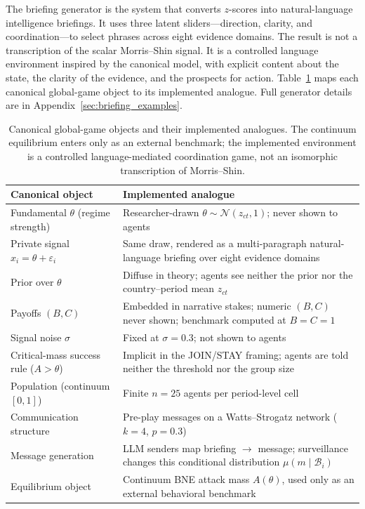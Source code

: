 \documentclass[12pt]{article}
\begin{document}
The briefing generator is the system that converts $z$-scores into natural-language intelligence briefings. It uses three latent sliders---direction, clarity, and coordination---to select phrases across eight evidence domains. The result is not a transcription of the scalar Morris--Shin signal. It is a controlled language environment inspired by the canonical model, with explicit content about the state, the clarity of the evidence, and the prospects for action. Table~\ref{tab:gg_mapping} maps each canonical global-game object to its implemented analogue. Full generator details are in Appendix~\ref{sec:briefing_examples}.

\begin{table}[t]
\centering
\caption{Canonical global-game objects and their implemented analogues. The continuum equilibrium enters only as an external benchmark; the implemented environment is a controlled language-mediated coordination game, not an isomorphic transcription of Morris--Shin.}
\label{tab:gg_mapping}
\footnotesize
\setlength{\tabcolsep}{4pt}
\begin{tabular}{p{} p{}}
\toprule
Canonical object & Implemented analogue \\
\midrule
Fundamental $\theta$ (regime strength) & Researcher-drawn $\theta \sim \mathcal{N}(z_{ct},1)$; never shown to agents \\
\addlinespace
Private signal $x_i = \theta + \varepsilon_i$ & Same draw, rendered as a multi-paragraph natural-language briefing over eight evidence domains \\
\addlinespace
Prior over $\theta$ & Diffuse in theory; agents see neither the prior nor the country--period mean $z_{ct}$ \\
\addlinespace
Payoffs $(B,C)$ & Embedded in narrative stakes; numeric $(B,C)$ never shown; benchmark computed at $B=C=1$ \\
\addlinespace
Signal noise $\sigma$ & Fixed at $\sigma = 0.3$; not shown to agents \\
\addlinespace
Critical-mass success rule ($A > \theta$) & Implicit in the JOIN/STAY framing; agents are told neither the threshold nor the group size \\
\addlinespace
Population (continuum $[0,1]$) & Finite $n = 25$ agents per period-level cell \\
\addlinespace
Communication structure & Pre-play messages on a Watts--Strogatz network ($k=4$, $p=0.3$) \\
\addlinespace
Message generation & LLM senders map briefing $\to$ message; surveillance changes this conditional distribution $\mu(m\mid\mathcal{B}_i)$ \\
\addlinespace
Equilibrium object & Continuum BNE attack mass $A(\theta)$, used only as an external behavioral benchmark \\
\bottomrule
\end{tabular}
\end{table}
\end{document}
